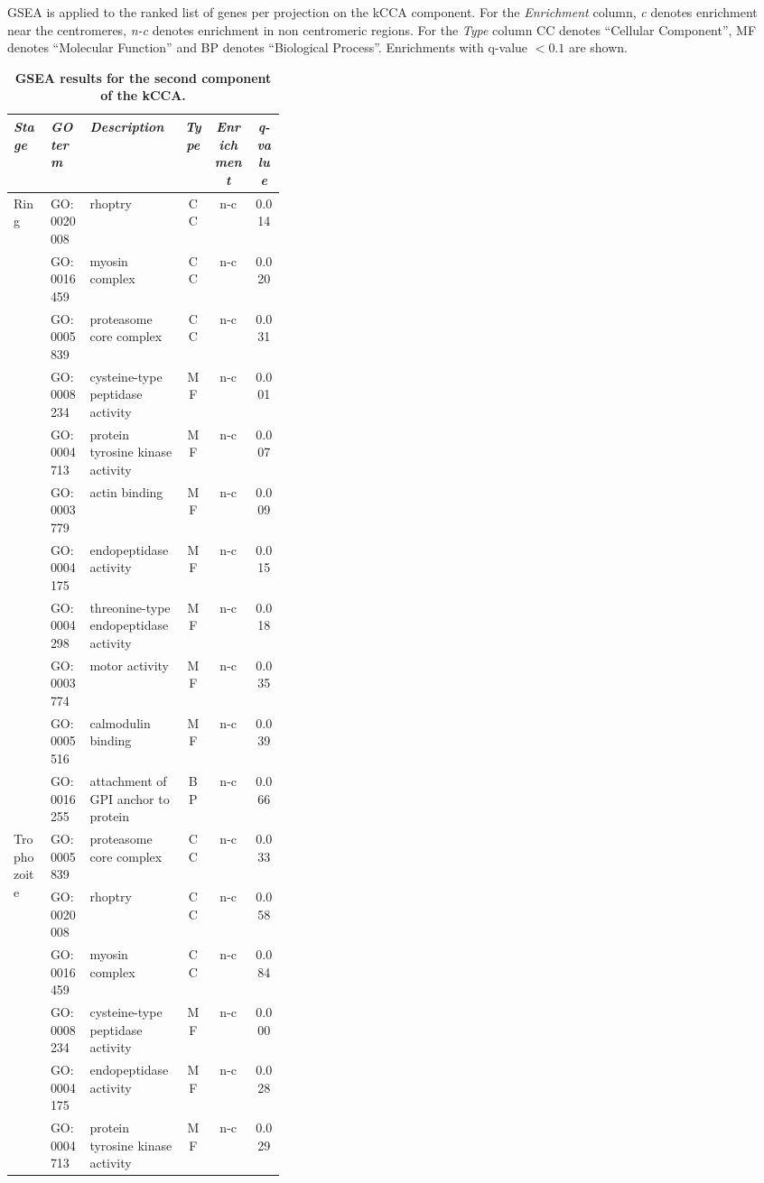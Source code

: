 \begin{table}
\caption{{\bf GSEA results for the second component of the kCCA.}}
{\normalsize GSEA is applied to the ranked list of genes per projection on the kCCA
component.
For the \emph{Enrichment} column, \emph{c} denotes enrichment near the
centromeres, \emph{n-c} denotes enrichment in non centromeric regions.
For the \emph{Type} column CC denotes ``Cellular Component'',
MF denotes ``Molecular Function'' and BP denotes ``Biological Process''.
Enrichments with q-value $< 0.1$ are shown.
}
\vspace{10pt}
\begin{center}
\begin{tabular}{llp{0.35\linewidth}ccc}
\hline
\emph{Stage} & \emph{GO term }&  \emph{Description} & \emph{Type} & \emph{Enrichment} & \emph{q-value}  \\
\hline
\multirow{11}{*}{Ring}
& GO:0020008 & rhoptry & CC & n-c & 0.014\\
& GO:0016459 & myosin complex & CC & n-c & 0.020\\
& GO:0005839 & proteasome core complex & CC & n-c & 0.031\\
& GO:0008234 & cysteine-type peptidase activity & MF  & n-c & 0.001\\
& GO:0004713 & protein tyrosine kinase activity & MF  & n-c & 0.007\\
& GO:0003779 & actin binding & MF  & n-c & 0.009\\
& GO:0004175 & endopeptidase activity & MF  & n-c & 0.015\\
& GO:0004298 & threonine-type endopeptidase activity & MF  & n-c & 0.018\\
& GO:0003774 & motor activity & MF  & n-c & 0.035\\
& GO:0005516 & calmodulin binding & MF  & n-c & 0.039\\
& GO:0016255 & attachment of GPI anchor to protein & BP & n-c & 0.066\\
\hline
\multirow{21}{*}{\small Trophozoite}
& GO:0005839 & proteasome core complex & CC & n-c & 0.033\\
& GO:0020008 & rhoptry & CC & n-c & 0.058\\
& GO:0016459 & myosin complex & CC & n-c & 0.084\\
& GO:0008234 & cysteine-type peptidase activity & MF  & n-c & 0.000\\
& GO:0004175 & endopeptidase activity & MF  & n-c & 0.028\\
& GO:0004713 & protein tyrosine kinase activity & MF  & n-c & 0.029\\

\end{tabular}
\end{center}
\end{table}
